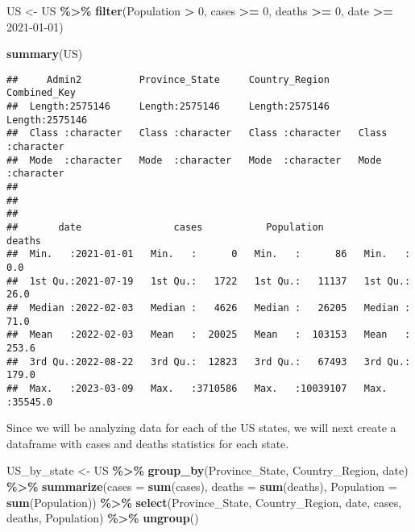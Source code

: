 \documentclass[
]{article}
\newenvironment{Shaded}{\begin{snugshade}}{\end{snugshade}}
\newcommand{\AttributeTok}[1]{\textcolor[rgb]{0.13,0.29,0.53}{#1}}
\newcommand{\DecValTok}[1]{\textcolor[rgb]{0.00,0.00,0.81}{#1}}
\newcommand{\FunctionTok}[1]{\textcolor[rgb]{0.13,0.29,0.53}{\textbf{#1}}}
\newcommand{\NormalTok}[1]{#1}
\newcommand{\OtherTok}[1]{\textcolor[rgb]{0.56,0.35,0.01}{#1}}
\newcommand{\SpecialCharTok}[1]{\textcolor[rgb]{0.81,0.36,0.00}{\textbf{#1}}}
\newcommand{\StringTok}[1]{\textcolor[rgb]{0.31,0.60,0.02}{#1}}
\begin{document}
\begin{Shaded}
\begin{Highlighting}[]
\NormalTok{US }\OtherTok{\textless{}{-}}\NormalTok{ US }\SpecialCharTok{\%\textgreater{}\%}
  \FunctionTok{filter}\NormalTok{(Population }\SpecialCharTok{\textgreater{}} \DecValTok{0}\NormalTok{, cases }\SpecialCharTok{\textgreater{}=} \DecValTok{0}\NormalTok{, deaths }\SpecialCharTok{\textgreater{}=} \DecValTok{0}\NormalTok{, date }\SpecialCharTok{\textgreater{}=} \StringTok{\textquotesingle{}2021{-}01{-}01\textquotesingle{}}\NormalTok{)}

\FunctionTok{summary}\NormalTok{(US)}
\end{Highlighting}
\end{Shaded}

\begin{verbatim}
##     Admin2          Province_State     Country_Region     Combined_Key      
##  Length:2575146     Length:2575146     Length:2575146     Length:2575146    
##  Class :character   Class :character   Class :character   Class :character  
##  Mode  :character   Mode  :character   Mode  :character   Mode  :character  
##                                                                             
##                                                                             
##                                                                             
##       date                cases           Population           deaths       
##  Min.   :2021-01-01   Min.   :      0   Min.   :      86   Min.   :    0.0  
##  1st Qu.:2021-07-19   1st Qu.:   1722   1st Qu.:   11137   1st Qu.:   26.0  
##  Median :2022-02-03   Median :   4626   Median :   26205   Median :   71.0  
##  Mean   :2022-02-03   Mean   :  20025   Mean   :  103153   Mean   :  253.6  
##  3rd Qu.:2022-08-22   3rd Qu.:  12823   3rd Qu.:   67493   3rd Qu.:  179.0  
##  Max.   :2023-03-09   Max.   :3710586   Max.   :10039107   Max.   :35545.0
\end{verbatim}

Since we will be analyzing data for each of the US states, we will next
create a dataframe with cases and deaths statistics for each state.

\begin{Shaded}
\begin{Highlighting}[]
\NormalTok{US\_by\_state }\OtherTok{\textless{}{-}}\NormalTok{ US }\SpecialCharTok{\%\textgreater{}\%}
  \FunctionTok{group\_by}\NormalTok{(Province\_State, Country\_Region, date) }\SpecialCharTok{\%\textgreater{}\%}
  \FunctionTok{summarize}\NormalTok{(}\AttributeTok{cases =} \FunctionTok{sum}\NormalTok{(cases), }\AttributeTok{deaths =} \FunctionTok{sum}\NormalTok{(deaths), }\AttributeTok{Population =} \FunctionTok{sum}\NormalTok{(Population)) }\SpecialCharTok{\%\textgreater{}\%}
  \FunctionTok{select}\NormalTok{(Province\_State, Country\_Region, date, cases, deaths, Population) }\SpecialCharTok{\%\textgreater{}\%}
  \FunctionTok{ungroup}\NormalTok{()}
\end{Highlighting}
\end{Shaded}
\end{document}

